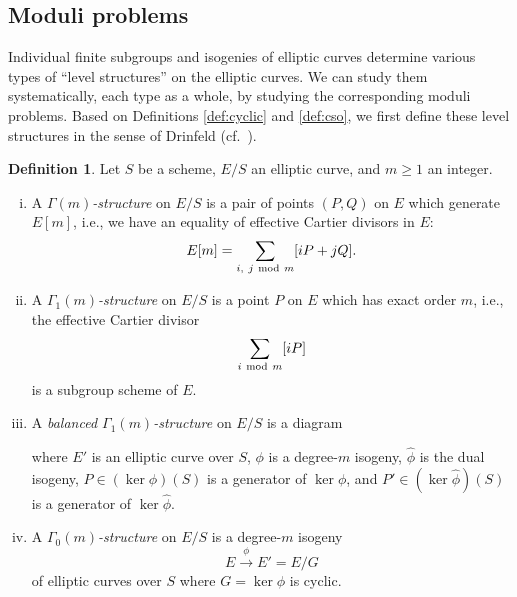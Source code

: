 \documentclass{gtpart}
\theoremstyle{definition}
\newtheorem{defn}[thm]{Definition}
\theoremstyle{remark}
\newcommand{\Hphi}{\widehat{\phi}}
\newcommand{\G}{\Gamma}
\numberwithin{equation}{section}
\numberwithin{thm}{section}
\begin{document}
\subsection{Moduli problems}
\label{subsec:mp}

Individual finite subgroups and isogenies of elliptic curves determine 
various types of ``level structures'' on the elliptic curves.  We can 
study them systematically, each type as a whole, by studying the 
corresponding moduli problems.  Based on Definitions \ref{def:cyclic} 
and \ref{def:cso}, we first define these level structures in the sense 
of Drinfeld (cf.~\cite[3.1-4 and 7.9.4]{KM}).  

\begin{defn}
\label{def:level}
 Let $S$ be a scheme, $E/S$ an elliptic curve, and $m \geq 1$ an 
 integer.  
 \begin{enumerate}[(i)]
  \item A {\em $\G(m)$-structure} on $E/S$ is a pair of points $(P,Q)$ 
  on $E$ which generate $E[m]$, i.e., we have an equality of effective 
  Cartier divisors in $E$: 
  \[
   E[m] = \sum_{i,~j {~\rm mod~} m} [iP + jQ].  
  \]

  \item A {\em $\G_1(m)$-structure} on $E/S$ is a point $P$ on $E$ which 
  has exact order $m$, i.e., the effective Cartier divisor 
  \[
   \sum_{i {~\rm mod~} m} [iP] 
  \]
  is a subgroup scheme of $E$.  

  \item A {\em balanced $\G_1(m)$-structure} on $E/S$ is a diagram 
  \begin{center}
  \end{center}
  where $E'$ is an elliptic curve over $S$, $\phi$ is a degree-$m$ 
  isogeny, $\Hphi$ is the dual isogeny, $P \in (\ker \phi)(S)$ is a 
  generator of $\ker \phi$, and $P' \in (\ker \Hphi)(S)$ is a generator 
  of $\ker \Hphi$.  

  \item \label{level(iv)} A {\em $\G_0(m)$-structure} on $E/S$ is a 
  degree-$m$ isogeny 
  \[
   E \stackrel{\phi}{\longrightarrow} E' = E/G 
  \]
  of elliptic curves over $S$ where $G = \ker \phi$ is cyclic.  


\end{enumerate}
\end{defn}
\end{document}
